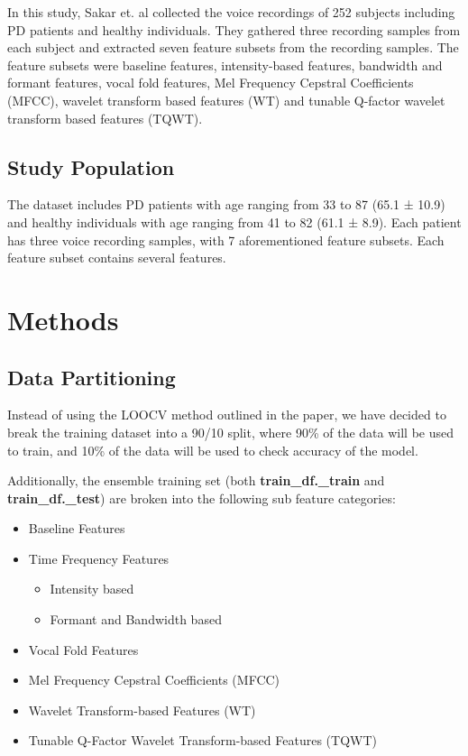 \documentclass[
]{article}
\providecommand{\tightlist}{%
  \setlength{\itemsep}{0pt}\setlength{\parskip}{0pt}}
\begin{document}
In this study, Sakar et. al collected the voice recordings of 252 subjects including PD patients and healthy individuals. They gathered three recording samples from each subject and extracted seven feature subsets from the recording samples. The feature subsets were baseline features, intensity-based features, bandwidth and formant features, vocal fold features, Mel Frequency Cepstral Coefficients (MFCC), wavelet transform based features (WT) and tunable Q-factor wavelet transform based features (TQWT).

\hypertarget{study-population}{%
\subsection{Study Population}\label{study-population}}

The dataset includes PD patients with age ranging from 33 to 87 (65.1 ± 10.9) and healthy individuals with age
ranging from 41 to 82 (61.1 ± 8.9). Each patient has three voice recording samples, with 7 aforementioned
feature subsets. Each feature subset contains several features.

\newpage

\hypertarget{methods}{%
\section{Methods}\label{methods}}

\hypertarget{data-partitioning}{%
\subsection{Data Partitioning}\label{data-partitioning}}

Instead of using the LOOCV method outlined in the paper, we have decided to break the training dataset into a 90/10 split, where 90\% of the data will be used to train, and 10\% of the data will be used to check accuracy of the model.

Additionally, the ensemble training set (both \textbf{train\_df.\_train} and \textbf{train\_df.\_test}) are broken into the following sub feature categories:

\begin{itemize}
\tightlist
\item
  Baseline Features
\item
  Time Frequency Features

  \begin{itemize}
  \tightlist
  \item
    Intensity based
  \item
    Formant and Bandwidth based
  \end{itemize}
\item
  Vocal Fold Features
\item
  Mel Frequency Cepstral Coefficients (MFCC)
\item
  Wavelet Transform-based Features (WT)
\item
  Tunable Q-Factor Wavelet Transform-based Features (TQWT)
\end{itemize}
\end{document}
